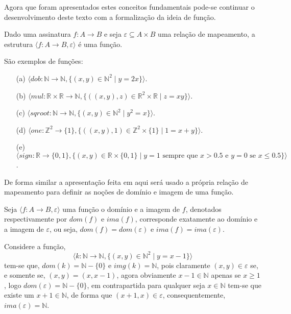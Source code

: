 Agora que foram apresentados estes conceitos fundamentais pode-se continuar o desenvolvimento deste texto com a formalização da ideia de função.

\begin{definicao}[Função]\label{def:Funcao}
	Dado uma assinatura $f: A \rightarrow B$ e seja $\varepsilon \subseteq A \times B$ uma relação de mapeamento, a estrutura $\langle f: A \rightarrow B, \varepsilon \rangle$ é uma função.
\end{definicao}

\begin{exemplo}\label{exe:Funcoes}
	São exemplos de funções:
	\begin{itemize}
		\item[(a)] $\langle dob: \mathbb{N} \rightarrow  \mathbb{N},  \{(x, y) \in \mathbb{N}^2 \mid  y = 2x\} \rangle$.
		\item[(b)] $\langle mul: \mathbb{R} \times \mathbb{R} \rightarrow  \mathbb{N},  \{((x, y), z) \in \mathbb{R}^2 \times \mathbb{R} \mid  z = xy\} \rangle$.
		\item[(c)] $\langle sqroot: \mathbb{N} \rightarrow \mathbb{N},  \{(x, y) \in \mathbb{N}^2 \mid  y^2 = x\} \rangle$.
		\item[(d)] $\langle one: \mathbb{Z}^2 \rightarrow  \{1\},  \{((x, y), 1) \in \mathbb{Z}^2 \times \{1\} \mid  1 = x+y\} \rangle$.
		\item[(e)] $\langle sign: \mathbb{R} \rightarrow  \{0,1\},  \{(x, y) \in \mathbb{R} \times \{0, 1\} \mid y = 1 \text{ sempre que } x > 0.5 \text{ e } y = 0 \text{ se } x \leq 0.5\} \rangle$.
	\end{itemize}
\end{exemplo}

De forma similar a apresentação feita em \cite{carmo2013} aqui será usado a própria relação de mapeamento para definir as noções de domínio e imagem de uma função.

\begin{definicao}\label{def:DomImaFuncao}
	Seja $\langle f: A \rightarrow B, \varepsilon \rangle$ uma função o domínio e a imagem de $f$, denotados respectivamente por $dom(f)$ e $ima(f)$, corresponde exatamente ao domínio e a imagem de $\varepsilon$, ou seja, $dom(f) = dom(\varepsilon)$ e $ima(f) = ima(\varepsilon)$.
\end{definicao}

\begin{exemplo}
	Considere a função, 
  $$\langle k:\mathbb{N} \rightarrow \mathbb{N}, \{(x, y) \in \mathbb{N}^2 \mid y = x - 1\} \rangle$$ 
  tem-se que, $dom(k) = \mathbb{N} - \{0\}$ e $img(k) = \mathbb{N}$, pois claramente $(x, y) \in \varepsilon$ se, e somente se, $(x, y) = (x, x - 1)$, agora obviamente $x - 1 \in \mathbb{N}$ apenas se $x \geq 1$, logo $dom(\varepsilon) = \mathbb{N} - \{0\}$, em contrapartida para qualquer seja $x \in \mathbb{N}$ tem-se que existe um $x + 1 \in \mathbb{N}$, de forma que $(x + 1, x)\in \varepsilon$, consequentemente, $ima(\varepsilon) = \mathbb{N}$.
\end{exemplo}

